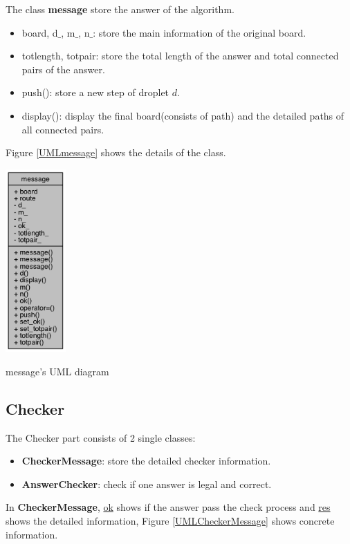 \documentclass[twocolumn]{article}
\begin{document}
The class \textbf{message} store the answer of the algorithm. 

\begin{itemize}
    \item board, d$\_$, m$\_$, n$\_$: store the main information of the original board.
    \item totlength, totpair: store the total length of the answer and total connected pairs of the answer.
    \item push(): store a new step of droplet $d$.
    \item display(): display the final board(consists of path) and the detailed paths of all connected pairs.
\end{itemize}

Figure \ref{UMLmessage} shows the details of the class.

\begin{center}
\makeatletter
\def\@captype{figure}
\makeatother
\includegraphics [height=7cm]{UMLmessage}
\caption{message's UML diagram}
\label{UMLmessage}
\end{center}


\subsection{Checker}

The Checker part consists of 2 single classes:

\begin{itemize}
    \item \textbf{CheckerMessage}: store the detailed checker information.
    \item \textbf{AnswerChecker}: check if one answer is legal and correct.
\end{itemize}

In \textbf{CheckerMessage}, \underline{ok} shows if the answer pass the check process and \underline{res} shows the detailed information, Figure \ref{UMLCheckerMessage} shows concrete information.
\end{document}
